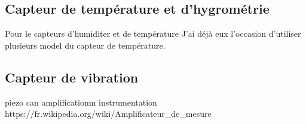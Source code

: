 \documentclass[5pt]{article}
\begin{document}
\subsection{Capteur de température et d'hygrométrie }
Pour le capteurs d'humiditer et de température
J'ai déjà eux l'occasion d'utiliser plusieurs model du capteur de température.


\subsection{Capteur de vibration}

piezo can amplificationm instrumentation
https://fr.wikipedia.org/wiki/Amplificateur_de_mesure

\end{document}
